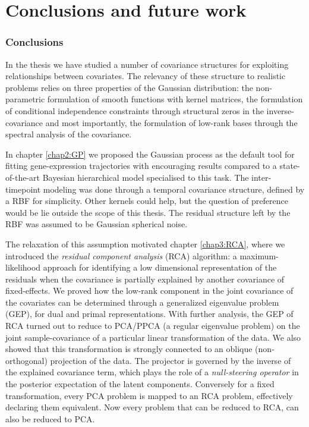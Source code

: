 \def\baselinestretch{1}
\chapter{Conclusions and future work} \label{chap7:conclusions}

\ifpdf
    \graphicspath{{Conclusions/ConclusionsFigs/PNG/}{Conclusions/ConclusionsFigs/PDF/}{Conclusions/ConclusionsFigs/}}
\else
    \graphicspath{{Conclusions/ConclusionsFigs/EPS/}{Conclusions/ConclusionsFigs/}}
\fi

\def\baselinestretch{1.66}



  \subsection*{Conclusions}

  In the thesis we have studied a number of covariance structures for exploiting relationships between covariates.
  The relevancy of these structure to realistic problems relies on three properties of the Gaussian distribution: the non-parametric formulation of smooth functions with kernel matrices, the formulation of conditional independence constraints through structural zeros in the inverse-covariance and most importantly, the formulation of low-rank bases through the spectral analysis of the covariance.

  In chapter \ref{chap2:GP} we proposed the Gaussian process as the default tool for fitting gene-expression trajectories with encouraging results compared to a state-of-the-art Bayesian hierarchical model specialised to this task.
  The inter-timepoint modeling was done through a temporal covariance structure, defined by a RBF for simplicity.
  Other kernels could help, but the question of preference would be lie outside the scope of this thesis.
  The residual structure left by the RBF was assumed to be Gaussian spherical noise.
  
  The relaxation of this assumption motivated chapter \ref{chap3:RCA}, where we introduced the \textit{residual component analysis} (RCA) algorithm: a maximum-likelihood approach for identifying a low dimensional representation of the residuals when the covariance is partially explained by another covariance of fixed-effects.
    We proved how the low-rank component in the joint covariance of the covariates can be determined through a generalized eigenvalue problem (GEP), for dual and primal representations.
    With further analysis, the GEP of RCA turned out to reduce to PCA/PPCA (a regular eigenvalue problem) on the joint sample-covariance of a particular linear transformation of the data.
    We also showed that this transformation is strongly connected to an oblique (non-orthogonal) projection of the data.
    The projector is governed by the inverse of the explained covariance term, which plays the role of a \textit{null-steering operator} in the posterior expectation of the latent components.
    Conversely for a fixed transformation, every PCA problem is mapped to an RCA problem, effectively declaring them equivalent.
    Now every problem that can be reduced to RCA, can also be reduced to PCA.
    
